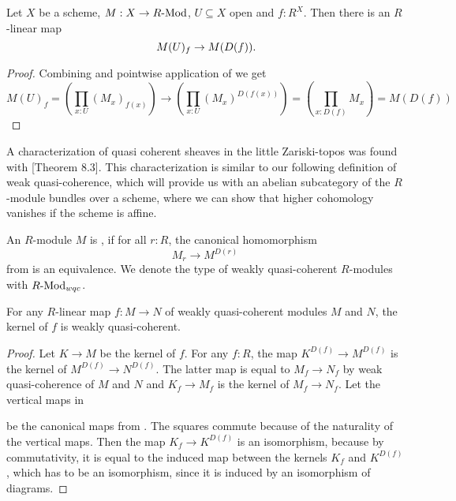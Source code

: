 \begin{lemma}%
  \label{localization-to-restriction}                    
  Let $X$ be a scheme, $M:X\to R\text{-}\mathrm{Mod}$, $U\subseteq X$ open and $f:R^X$.
  Then there is an $R$-linear map
  \[
    M(U)_f \to M(D(f)) 
    \rlap{.}
  \]
\end{lemma}

\begin{proof}
  Combining 
  and pointwise application of  we get
  \[
    M(U)_f=\left(\prod_{x:U}(M_x)_{f(x)}\right)\to \left(\prod_{x:U}(M_x)^{D(f(x))}\right)
    =\left(\prod_{x:D(f)}M_x\right)
    =M(D(f))
  \]
\end{proof}

A characterization of quasi coherent sheaves in the little Zariski-topos was found with \cite{ingo-thesis}[Theorem 8.3].
This characterization is similar to our following definition of weak quasi-coherence,
which will provide us with an abelian subcategory of the $R$-module bundles over a scheme,
where we can show that higher cohomology vanishes if the scheme is affine.

\begin{definition}
  \label{weakly-quasi-coherent-module}
  An $R$-module $M$ is ,
  if for all $r:R$, the canonical homomorphism
  \[
    M_r\to M^{D(r)}
  \]
  from  is an equivalence.
  We denote the type of weakly quasi-coherent $R$-modules
  with $R\text{-}\mathrm{Mod}_{wqc}$.
\end{definition}

\begin{lemma}
  \label{kernel-wqc}
  For any $R$-linear map $f:M\to N$ of weakly quasi-coherent modules $M$ and $N$,
  the kernel of $f$ is weakly quasi-coherent.
\end{lemma}

\begin{proof}
  Let $K\to M$ be the kernel of $f$.
  For any $f:R$, the map $K^{D(f)}\to M^{D(f)}$ is the kernel of $M^{D(f)}\to N^{D(f)}$.
  The latter map is equal to $M_f\to N_f$ by weak quasi-coherence of $M$ and $N$
  and $K_f\to M_f$ is the kernel of $M_f\to N_f$.
  Let the vertical maps in
  \begin{center}
  \end{center}
  be the canonical maps from .
  The squares commute because of the naturality of the vertical maps.
  Then the map $K_f\to K^{D(f)}$ is an isomorphism,
  because by commutativity, it is equal to the induced map between the kernels $K_f$ and $K^{D(f)}$,
  which has to be an isomorphism, since it is induced by an isomorphism of diagrams.
\end{proof}

